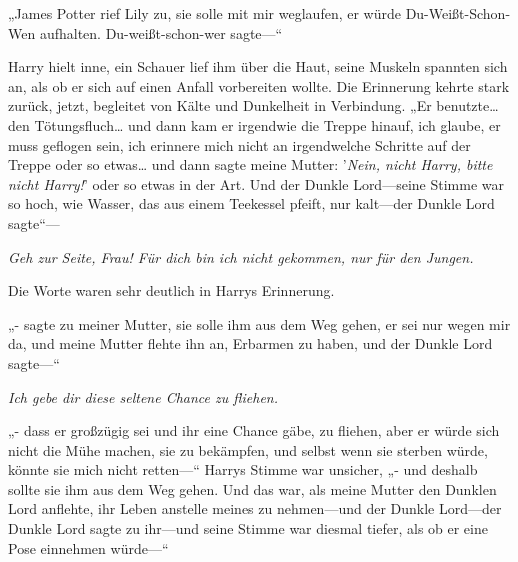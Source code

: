 „James Potter rief Lily zu, sie solle mit mir weglaufen, er würde Du-Weißt-Schon-Wen aufhalten. Du-weißt-schon-wer sagte—“

Harry hielt inne, ein Schauer lief ihm über die Haut, seine Muskeln spannten sich an, als ob er sich auf einen Anfall vorbereiten wollte. Die Erinnerung kehrte stark zurück, jetzt, begleitet von Kälte und Dunkelheit in Verbindung.
„Er benutzte… den Tötungsfluch… und dann kam er irgendwie die Treppe hinauf, ich glaube, er muss geflogen sein, ich erinnere mich nicht an irgendwelche Schritte auf der Treppe oder so etwas… und dann sagte meine Mutter: '\emph{Nein, nicht Harry, bitte nicht Harry!}' oder so etwas in der Art. Und der Dunkle Lord—seine Stimme war so hoch, wie Wasser, das aus einem Teekessel pfeift, nur kalt—der Dunkle Lord sagte“—

\emph{Geh zur Seite, Frau! Für dich bin ich nicht gekommen, nur für den Jungen.}

Die Worte waren sehr deutlich in Harrys Erinnerung.

„- sagte zu meiner Mutter, sie solle ihm aus dem Weg gehen, er sei nur wegen mir da, und meine Mutter flehte ihn an, Erbarmen zu haben, und der Dunkle Lord sagte—“

\emph{Ich gebe dir diese seltene Chance zu fliehen.}

„- dass er großzügig sei und ihr eine Chance gäbe, zu fliehen, aber er würde sich nicht die Mühe machen, sie zu bekämpfen, und selbst wenn sie sterben würde, könnte sie mich nicht retten—“ Harrys Stimme war unsicher, „- und deshalb sollte sie ihm aus dem Weg gehen. Und das war, als meine Mutter den Dunklen Lord anflehte, ihr Leben anstelle meines zu nehmen—und der Dunkle Lord—der Dunkle Lord sagte zu ihr—und seine Stimme war diesmal tiefer, als ob er eine Pose einnehmen würde—“

